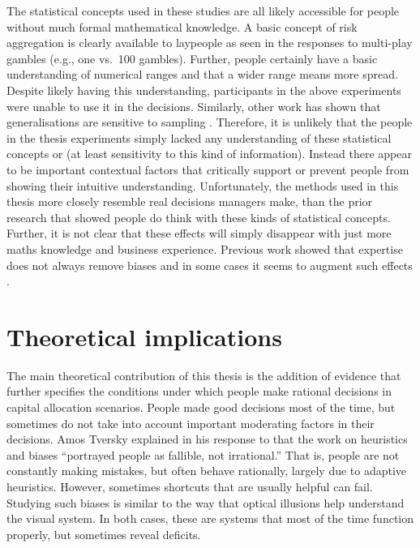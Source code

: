 \documentclass[a4paper, nobind, dvipsnames]{templates/ociamthesis}
\theoremstyle{definition}
\theoremstyle{definition}
\theoremstyle{definition}
\theoremstyle{definition}
\theoremstyle{remark}
\begin{document}
The statistical concepts used in these studies are all likely accessible for
people without much formal mathematical knowledge. A basic concept of risk
aggregation is clearly available to laypeople as seen in the responses to
multi-play gambles (e.g., one vs.~100 gambles). Further, people certainly have a
basic understanding of numerical ranges and that a wider range means more
spread. Despite likely having this understanding, participants in the above
experiments were unable to use it in the decisions. Similarly, other work has
shown that generalisations are sensitive to sampling \autocite{carvalho2021}. Therefore,
it is unlikely that the people in the thesis experiments simply lacked any
understanding of these statistical concepts or (at least sensitivity to this
kind of information). Instead there appear to be important contextual factors
that critically support or prevent people from showing their intuitive
understanding. Unfortunately, the methods used in this thesis more closely
resemble real decisions managers make, than the prior research that showed
people do think with these kinds of statistical concepts. Further, it is not
clear that these effects will simply disappear with just more maths knowledge
and business experience. Previous work showed that expertise does not always
remove biases and in some cases it seems to augment such effects \autocite[e.g.,][]{haigh2005}.

\hypertarget{theoretical-implications}{%
\section{Theoretical implications}\label{theoretical-implications}}

The main theoretical contribution of this thesis is the addition of evidence
that further specifies the conditions under which people make rational decisions
in capital allocation scenarios. People made good decisions most of the time,
but sometimes do not take into account important moderating factors in their
decisions. Amos Tversky explained in his response to \textcite[p.~355]{cohen1981} that
the work on heuristics and biases ``portrayed people as fallible, not
irrational.'' That is, people are not constantly making mistakes, but often
behave rationally, largely due to adaptive heuristics. However, sometimes
shortcuts that are usually helpful can fail. Studying such biases is similar to
the way that optical illusions help understand the visual system. In both cases,
these are systems that most of the time function properly, but sometimes reveal
deficits.
\end{document}
